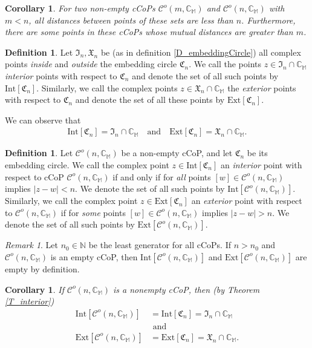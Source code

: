 \documentclass[12pt]{amsart}
\newtheorem{corollary}[theorem]{Corollary}
\theoremstyle{definition}
\newtheorem{definition}[theorem]{Definition}
\theoremstyle{remark}
\newtheorem{remark}[theorem]{Remark}
\numberwithin{equation}{section}
\newcommand{\abs}[1]{\lvert#1\rvert}
\newcommand{\C}{\mathcal{C}}
\newcommand{\CC}{\mathbb{C}}
\newcommand{\CV}{\mathfrak{C}}
\newcommand{\M}{\mathbb{M}}
\newcommand{\I}{\mathfrak{I}}
\newcommand{\E}{\mathfrak{X}}
\newcommand{\N}{\mathbb{N}}
\newcommand{\In}[1]{\mathrm{Int}[#1]}
\newcommand{\Ex}[1]{\mathrm{Ext}[#1]}
\begin{document}
\begin{corollary}
For two non-empty cCoPs $\C^o(m,\CC_{\M})$ and $\C^o(n,\CC_{\M})$ with $m<n$, all distances between points of these sets are less than $n$. Furthermore, there are some points in these cCoPs whose mutual distances are greater than $m$.
\end{corollary}
\bigskip

\begin{definition}\label{D_IntExt}
Let $\I_n,\E_n$ be (as in definition \ref{D_embeddingCircle}) all complex points \emph{inside} and \emph{outside} the embedding circle $\CV_n$. We call the points $z\in\I_n\cap\CC_{\M}$ \emph{interior} points with respect to $\CV_n$ and denote the set of all such points by $\In{\CV_n}$. Similarly, we call the complex points $z\in\E_n\cap\CC_{\M}$ the \emph{exterior} points with respect to $\CV_n$ and denote the set of all these points by $\Ex{\CV_n}$.
\bigskip

We can observe that
\begin{align*}
\In{\CV_n}=\I_n\cap\CC_{\M}\quad\text{and}\quad
\Ex{\CV_n}=\E_n\cap\CC_{\M}.
\end{align*}
\end{definition}

\begin{definition}
Let $\C^o(n,\CC_{\M})$ be a non-empty cCoP, and let $\CV_n$ be its embedding circle. We call the complex point $z\in\In{\CV_n}$ an \emph{interior} point with respect to cCoP $\C^o(n,\CC_{\M})$ if and only if for \emph{all} points $[w]\in\C^o(n,\CC_{\M})$ implies $\abs{z-w}<n$. We denote the set of all such points by $\In{\C^o(n,\CC_{\M})}$. Similarly, we call the complex point $z\in\Ex{\CV_n}$ an \emph{exterior} point with respect to $\C^o(n,\CC_{\M})$ if for \emph{some} points $[w]\in\C^o(n,\CC_{\M})$ implies $\abs{z-w}>n$. We denote the set of all such points by $\Ex{\C^o(n,\CC_{\M})}$.
\end{definition}
\bigskip

\begin{remark}
Let $n_0\in\N$ be the least generator for all cCoPs.
If $n>n_0$ and $\C^o(n,\CC_{\M})$ is an empty cCoP, then $\In{\C^o(n,\CC_{\M})}$ and $\Ex{\C^o(n,\CC_{\M})}$ are empty by definition.
\end{remark}

\begin{corollary}
If $\C^o(n,\CC_{\M})$ is a nonempty cCoP, then (by Theorem \ref{T_interior})
\begin{align}\label{E_IntExt}
\In{\C^o(n,\CC_{\M})}&=\In{\CV_n}=\I_n\cap\CC_{\M}\nonumber\\
&\mbox{ and }\\
\Ex{\C^o(n,\CC_{\M})}&=\Ex{\CV_n}=\E_n\cap\CC_{\M}\nonumber.
\end{align}
\end{corollary}
\bigskip
\end{document}
